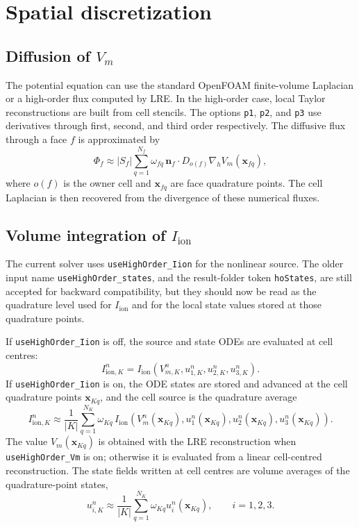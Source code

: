 \documentclass[11pt,a4paper]{article}
\newcommand{\code}[1]{\texttt{#1}}
\begin{document}
\section{Spatial discretization}
\subsection{Diffusion of \texorpdfstring{$V_m$}{Vm}}
The potential equation can use the standard OpenFOAM finite-volume Laplacian or a high-order flux computed by LRE. In the high-order case, local Taylor reconstructions are built from cell stencils. The options \code{p1}, \code{p2}, and \code{p3} use derivatives through first, second, and third order respectively. The diffusive flux through a face $f$ is approximated by
\begin{equation}
\Phi_f
\approx |S_f|\sum_{q=1}^{N_f} \omega_{fq}\,
\mathbf{n}_f\cdot D_{o(f)}\nabla_h V_m(\mathbf{x}_{fq}),
\end{equation}
where $o(f)$ is the owner cell and $\mathbf{x}_{fq}$ are face quadrature points. The cell Laplacian is then recovered from the divergence of these numerical fluxes.

\subsection{Volume integration of \texorpdfstring{$I_{\mathrm{ion}}$}{Iion}}
The current solver uses \code{useHighOrder\_Iion} for the nonlinear source. The older input name \code{useHighOrder\_states}, and the result-folder token \code{hoStates}, are still accepted for backward compatibility, but they should now be read as the quadrature level used for $I_{\mathrm{ion}}$ and for the local state values stored at those quadrature points.

If \code{useHighOrder\_Iion} is off, the source and state ODEs are evaluated at cell centres:
\begin{equation}
I_{\mathrm{ion},K}^n
= I_{\mathrm{ion}}\!\left(V_{m,K}^n,u_{1,K}^n,u_{2,K}^n,u_{3,K}^n\right).
\end{equation}
If \code{useHighOrder\_Iion} is on, the ODE states are stored and advanced at the cell quadrature points $\mathbf{x}_{Kq}$, and the cell source is the quadrature average
\begin{equation}
I_{\mathrm{ion},K}^n
\approx \frac{1}{|K|}
\sum_{q=1}^{N_K}\omega_{Kq}\,
I_{\mathrm{ion}}\!\left(
V_m^n(\mathbf{x}_{Kq}),
u_1^n(\mathbf{x}_{Kq}),
u_2^n(\mathbf{x}_{Kq}),
u_3^n(\mathbf{x}_{Kq})
\right).
\end{equation}
The value $V_m(\mathbf{x}_{Kq})$ is obtained with the LRE reconstruction when \code{useHighOrder\_Vm} is on; otherwise it is evaluated from a linear cell-centred reconstruction. The state fields written at cell centres are volume averages of the quadrature-point states,
\begin{equation}
u_{i,K}^n \approx \frac{1}{|K|}
\sum_{q=1}^{N_K}\omega_{Kq}u_i^n(\mathbf{x}_{Kq}),
\qquad i=1,2,3.
\end{equation}
\end{document}
